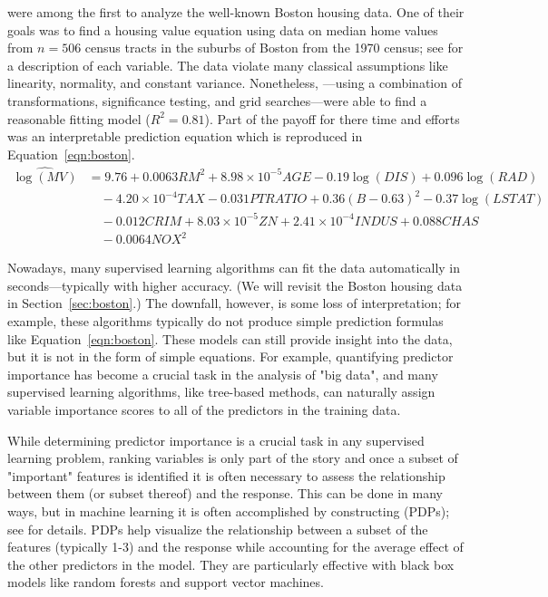 \citet{harrison-1978-hedonic} were among the first to analyze the well-known Boston housing data. One of their goals was to find a housing value equation using data on median home values from $n = 506$ census tracts in the suburbs of Boston from the 1970 census; see \citet[Table IV]{harrison-1978-hedonic} for a description of each variable. The data violate many classical assumptions like linearity, normality, and constant variance. Nonetheless, \citeauthor{harrison-1978-hedonic}---using a combination of transformations, significance testing, and grid searches---were able to find a reasonable fitting model ($R^2 = 0.81$). Part of the payoff for there time and efforts was an interpretable prediction equation which is reproduced in Equation~\eqref{eqn:boston}.
\begin{equation}
\label{eqn:boston}
\begin{aligned}
\widehat{\log\left(MV\right)} &= 9.76 + 0.0063 RM^2 + 8.98\times10^{-5} AGE - 0.19\log\left(DIS\right) + 0.096\log\left(RAD\right) \\
  & \quad - 4.20\times10^{-4} TAX - 0.031 PTRATIO + 0.36\left(B - 0.63\right)^2 - 0.37\log\left(LSTAT\right) \\
  & \quad - 0.012 CRIM + 8.03\times10^{-5} ZN + 2.41\times10^{-4} INDUS + 0.088 CHAS \\
  & \quad - 0.0064 NOX^2
\end{aligned}
\end{equation}

Nowadays, many supervised learning algorithms can fit the data automatically in seconds---typically with higher accuracy. (We will revisit the Boston housing data in Section~\ref{sec:boston}.) The downfall, however, is some loss of interpretation; for example, these algorithms typically do not produce simple prediction formulas like Equation~\eqref{eqn:boston}. These models can still provide insight into the data, but it is not in the form of simple equations. For example, quantifying predictor importance has become a crucial task in the analysis of "big data", and many supervised learning algorithms, like tree-based methods, can naturally assign variable importance scores to all of the predictors in the training data.

While determining predictor importance is a crucial task in any supervised learning problem, ranking variables is only part of the story and once a subset of "important" features is identified it is often necessary to assess the relationship between them (or subset thereof) and the response. This can be done in many ways, but in machine learning it is often accomplished by constructing  (PDPs); see \citet{friedman-2001-greedy} for details. PDPs help visualize the relationship between a subset of the features (typically 1-3) and the response while accounting for the average effect of the other predictors in the model. They are particularly effective with black box models like random forests and support vector machines.

